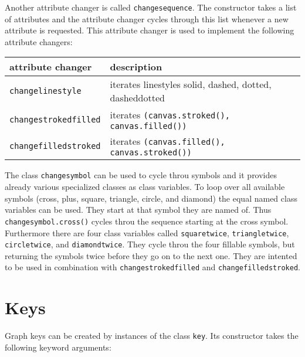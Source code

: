Another attribute changer is called \verb|changesequence|. The
constructor takes a list of attributes and the attribute changer
cycles through this list whenever a new attribute is requested.
This attribute changer is used to implement the following attribute
changers:

\begin{center}
\begin{tabular}{ll}
attribute changer&description\\
\hline
\texttt{changelinestyle}&iterates linestyles solid, dashed, dotted, dasheddotted\\
\texttt{changestrokedfilled}&iterates \texttt{(canvas.stroked(), canvas.filled())}\\
\texttt{changefilledstroked}&iterates \texttt{(canvas.filled(), canvas.stroked())}\\
\end{tabular}
\end{center}

The class \verb|changesymbol| can be used to cycle throu symbols and it
provides already various specialized classes as class variables. To
loop over all available symbols (cross, plus, square, triangle,
circle, and diamond) the equal named class variables can be used. They
start at that symbol they are named of. Thus \verb|changesymbol.cross()|
cycles throu the sequence starting at the cross symbol. Furthermore
there are four class variables called \verb|squaretwice|,
\verb|triangletwice|, \verb|circletwice|, and \verb|diamondtwice|.
They cycle throu the four fillable symbols, but returning the symbols
twice before they go on to the next one. They are intented to be used
in combination with \verb|changestrokedfilled| and
\verb|changefilledstroked|.

\section{Keys}

Graph keys can be created by instances of the class \verb|key|. Its
constructor takes the following keyword arguments:

